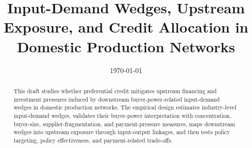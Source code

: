 \documentclass[12pt]{ctexart}
\title{Input-Demand Wedges, Upstream Exposure, and Credit Allocation in Domestic Production Networks}
\author{}
\date{\today}
\begin{document}
\maketitle

\begin{abstract}
This draft studies whether preferential credit mitigates upstream financing and investment pressures induced by downstream buyer-power-related input-demand wedges in domestic production networks. The empirical design estimates industry-level input-demand wedges, validates their buyer-power interpretation with concentration, buyer-size, supplier-fragmentation, and payment-pressure measures, maps downstream wedges into upstream exposure through input-output linkages, and then tests policy targeting, policy effectiveness, and payment-related trade-offs.
\end{abstract}







% 
% 
\end{document}
